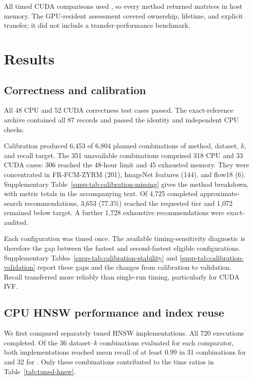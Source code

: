 \documentclass[article]{jss}
\newcommand{\fct}[1]{\code{#1()}}
\begin{document}
All timed CUDA comparisons used \fct{nn}, so every method returned matrices
in host memory. The GPU-resident assessment covered ownership, lifetime, and
explicit transfer; it did not include a transfer-performance benchmark.

\section{Results} \label{sec:results}

\subsection{Correctness and calibration}

All 48 CPU and 52 CUDA correctness test cases passed. The exact-reference
archive contained all 87 records and passed the identity and independent
CPU checks.

Calibration produced 6,453 of 6,804 planned combinations of method, dataset,
$k$, and recall target. The 351 unavailable combinations comprised 318 CPU
and 33 CUDA cases: 306 reached the 48-hour limit and 45 exhausted memory.
They were concentrated in FR-FCM-ZYRM (201), ImageNet features (144), and
flow18 (6). Supplementary Table~\ref{supp-tab:calibration-missing} gives the
method breakdown, with metric totals in the accompanying text.
Of 4,725 completed approximate-search recommendations, 3,653 (77.3\%)
reached the requested tier and 1,072 remained below target. A further 1,728
exhaustive recommendations were exact-audited.

Each configuration was timed once. The available timing-sensitivity diagnostic
is therefore the gap between the fastest and second-fastest eligible
configurations. Supplementary
Tables~\ref{supp-tab:calibration-stability} and
\ref{supp-tab:calibration-validation} report these gaps and the changes from
calibration to validation. Recall transferred more reliably than single-run
timing, particularly for CUDA IVF.

\subsection{CPU HNSW performance and index reuse}

We first compared separately tuned HNSW implementations. All 720 executions
completed. Of the 36 dataset--$k$ combinations evaluated for each comparator,
both implementations reached mean recall of at least 0.99 in 31 combinations
for  and 32 for . Only these combinations
contributed to the time ratios in Table~\ref{tab:tuned-hnsw}.
\end{document}
